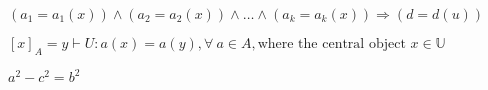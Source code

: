 \documentclass[a4paper,11pt]{article}
\begin{document}
$(a_1=a_1(x))\wedge(a_2=a_2(x))\wedge\ldots\wedge(a_k=a_k(x))\Rightarrow(d=d(u)) $ 

$[x]_A={y\vdash{U}:a(x)=a(y),\forall \ a\in A}, 
\textrm{where the central object }x\in\mathbb{U}$


\begin{math}
a^{2}-c^{2}=b^{2}
\end{math}
\end{document}
